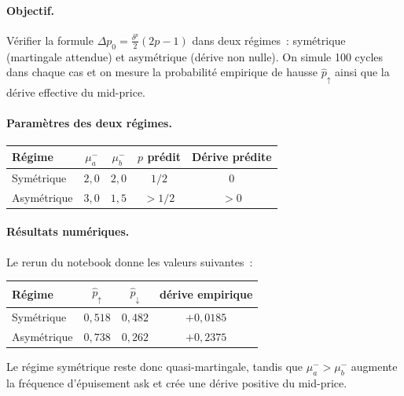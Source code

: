 \documentclass[11pt,a4paper]{article}
\theoremstyle{definition}
\begin{document}
\begin{demonstration}

\paragraph{Objectif.}
Vérifier la formule $\Delta p_0 = \tfrac{\delta^p}{2}(2p-1)$ dans deux
régimes~: symétrique (martingale attendue) et asymétrique (dérive non nulle).
On simule 100 cycles dans chaque cas et on mesure la probabilité empirique
de hausse $\hat p_\uparrow$ ainsi que la dérive effective du mid-price.

\paragraph{Paramètres des deux régimes.}
\begin{center}\small
\begin{tabular}{@{}lcccc@{}}
\toprule
Régime & $\mu^-_a$ & $\mu^-_b$ & $p$ prédit & Dérive prédite \\
\midrule
Symétrique  & $2{,}0$ & $2{,}0$ & $1/2$ & $0$ \\
Asymétrique & $3{,}0$ & $1{,}5$ & $>1/2$ & $>0$ \\
\bottomrule
\end{tabular}
\end{center}

\paragraph{Résultats numériques.}
Le rerun du notebook donne les valeurs suivantes~:
\begin{center}\small
\begin{tabular}{@{}lccc@{}}
\toprule
Régime & $\hat p_\uparrow$ & $\hat p_\downarrow$ & dérive empirique \\
\midrule
Symétrique  & $0{,}518$ & $0{,}482$ & $+0{,}0185$ \\
Asymétrique & $0{,}738$ & $0{,}262$ & $+0{,}2375$ \\
\bottomrule
\end{tabular}
\end{center}
Le régime symétrique reste donc quasi-martingale, tandis que
$\mu_a^->\mu_b^-$ augmente la fréquence d'épuisement ask et crée une dérive
positive du mid-price.


\end{demonstration}
\end{document}
